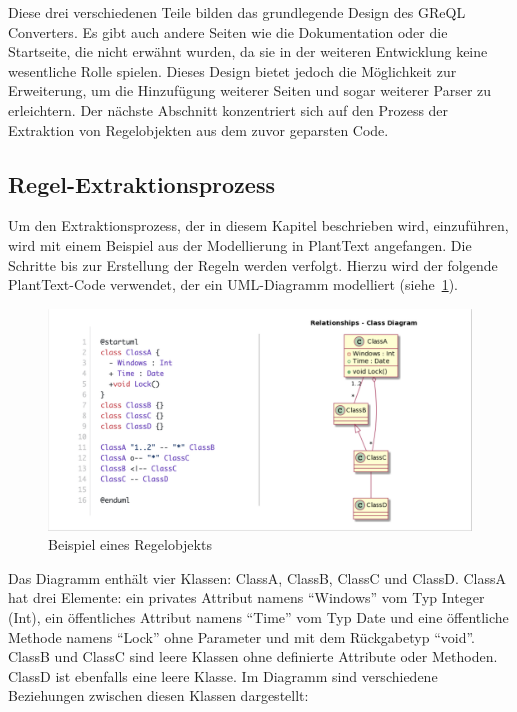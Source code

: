 Diese drei verschiedenen Teile bilden das grundlegende Design des \gls{GReQL Converter}s. Es gibt auch andere Seiten wie die
Dokumentation oder die Startseite, die nicht erwähnt wurden, da sie in der weiteren Entwicklung keine wesentliche Rolle
spielen. Dieses Design bietet jedoch die Möglichkeit zur Erweiterung, um die Hinzufügung weiterer Seiten und sogar
weiterer Parser zu erleichtern. Der nächste Abschnitt konzentriert sich auf den Prozess der Extraktion von Regelobjekten
aus dem zuvor geparsten Code.

\subsection{Regel-Extraktionsprozess}\label{subsec:regel-extraktionsprozess}


Um den Extraktionsprozess, der in diesem Kapitel beschrieben wird, einzuführen, wird mit einem Beispiel aus der
Modellierung in PlantText angefangen. Die Schritte bis zur Erstellung der Regeln werden verfolgt. Hierzu wird der
folgende PlantText-Code verwendet, der ein UML-Diagramm modelliert (siehe~\ref{fig:code-uml}).

\begin{figure}[h]
    \centering
    \includegraphics[width=16cm]{images/code-uml}
    \caption{Beispiel eines Regelobjekts}
    \label{fig:code-uml}
\end{figure}

Das Diagramm enthält vier Klassen: ClassA, ClassB, ClassC und ClassD\@. ClassA hat drei Elemente: ein privates Attribut
namens ``Windows'' vom Typ Integer (Int), ein öffentliches Attribut namens ``Time'' vom Typ Date und eine öffentliche
Methode namens ``Lock'' ohne Parameter und mit dem Rückgabetyp ``void''. ClassB und ClassC sind leere Klassen ohne
definierte Attribute oder Methoden. ClassD ist ebenfalls eine leere Klasse. Im Diagramm sind verschiedene Beziehungen
zwischen diesen Klassen dargestellt:

